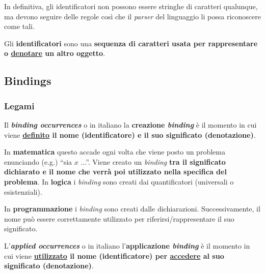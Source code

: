 \documentclass[a4paper]{article}
\newcommand{\dquotes}[1]{``#1''}
\begin{document}
	\noindent
	In definitiva, gli identificatori non possono essere stringhe di caratteri qualunque, ma devono seguire delle regole così che il \emph{parser} del linguaggio li possa riconoscere come tali.\newline
	
	\noindent
	\begin{boxdef}
		Gli \textcolor{Red3}{\textbf{identificatori}} sono una \textbf{sequenza di caratteri usata per rappresentare o \underline{denotare} un altro oggetto}.
	\end{boxdef}\newpage
	
	\subsection{Bindings}
	
	\subsubsection{Legami}
	
	\begin{boxdef}
		Il \textcolor{Red3}{\textbf{\emph{binding occurrences}}} o in italiano la \textcolor{Red3}{\textbf{creazione \emph{binding}}} è il momento in cui viene \textbf{\underline{definito} il nome (identificatore) e il suo significato (denotazione)}.
	\end{boxdef}

	\noindent
	In \textbf{matematica} questo accade ogni volta che viene posto un problema enunciando (e.g.) \dquotes{sia $x$ ...}. Viene creato un \emph{binding} \textbf{tra il significato dichiarato e il nome che verrà poi utilizzato nella specifica del problema}. In \textbf{logica} i \emph{binding} sono creati dai quantificatori (universali o esistenziali).\newline
	
	\noindent
	In \textbf{programmazione} i \emph{binding} sono creati dalle dichiarazioni. Successivamente, il nome può essere correttamente utilizzato per riferirsi/rappresentare il suo significato.\newline
	
	\noindent
	\begin{boxdef}
		L'\textcolor{Red3}{\textbf{\emph{applied occurrences}}} o in italiano l'\textcolor{Red3}{\textbf{applicazione \emph{binding}}} è il momento in cui viene \textbf{\underline{utilizzato} il nome (identificatore) per \underline{accedere} al suo significato (denotazione)}.
	\end{boxdef}
\end{document}
